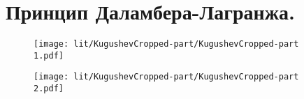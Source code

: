 \section{Принцип Даламбера-Лагранжа.}
\label{cha1sec1}

% 

\begin{figure}[h!]
	\noindent
	\centering
	\texttt{[image: lit/KugushevCropped-part/KugushevCropped-part 1.pdf]}
\end{figure}

\begin{figure}[h!]
	\noindent
	\centering
	\texttt{[image: lit/KugushevCropped-part/KugushevCropped-part 2.pdf]}
\end{figure}

% 

\newpage